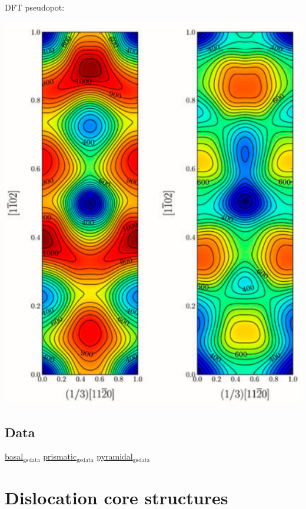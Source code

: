 \documentclass[11pt]{article}
\begin{document}
DFT pseudopot:
\begin{center}
\includegraphics[width=.9\linewidth]{Images/pyramidal_gamma_surface_ready_data_both.png}
\end{center}

\subsection{Data}
\label{sec:org3e5531f}
\href{file:///home/tigany/Documents/ti/final\_model\_2019-11-12/results\_2019-11-09\_muc/gamma\_surfaces/basal/basal\_gs\_noo\_alat\_energies.dat}{basal\(_{\text{gs}}\)\(_{\text{data}}\)}
\href{file:///home/tigany/Documents/ti/final\_model\_2019-11-12/results\_2019-11-09\_muc/gamma\_surfaces/prismatic/prismatic\_gs\_noo\_alat\_energies.dat}{prismatic\(_{\text{gs}}\)\(_{\text{data}}\)}
\href{file:///home/tigany/Documents/ti/final\_model\_2019-11-12/gamma\_surfaces/pyramidal\_results\_2019-11-13/pyramidal\_gamma\_surface\_2019-11-13.dat}{pyramidal\(_{\text{gs}}\)\(_{\text{data}}\)}
\section{Dislocation core structures}
\label{sec:org312ecc1}
\end{document}
